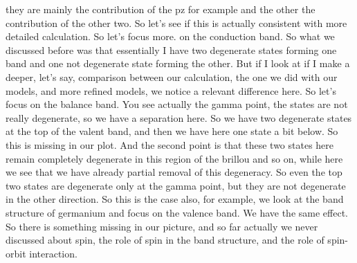 they are mainly the contribution of the pz for example and the other the contribution of the other two. So let's see if this is actually consistent with more detailed calculation. So let's focus more. on the conduction band. So what we discussed before was that essentially I have two degenerate states forming one band and one not degenerate state forming the other. But if I look at if I make a deeper, let's say, comparison between our calculation, the one we did with our models, and more refined models, we notice a relevant difference here. So let's focus on the balance band. You see actually the gamma point, the states are not really degenerate, so we have a separation here. So we have two degenerate states at the top of the valent band, and then we have here one state a bit below. So this is missing in our plot. And the second point is that these two states here remain completely degenerate in this region of the brillou and so on, while here we see that we have already partial removal of this degeneracy. So even the top two states are degenerate only at the gamma point, but they are not degenerate in the other direction. So this is the case also, for example, we look at the band structure of germanium and focus on the valence band. We have the same effect. So there is something missing in our picture, and so far actually we never discussed about spin, the role of spin in the band structure, and the role of spin-orbit interaction.